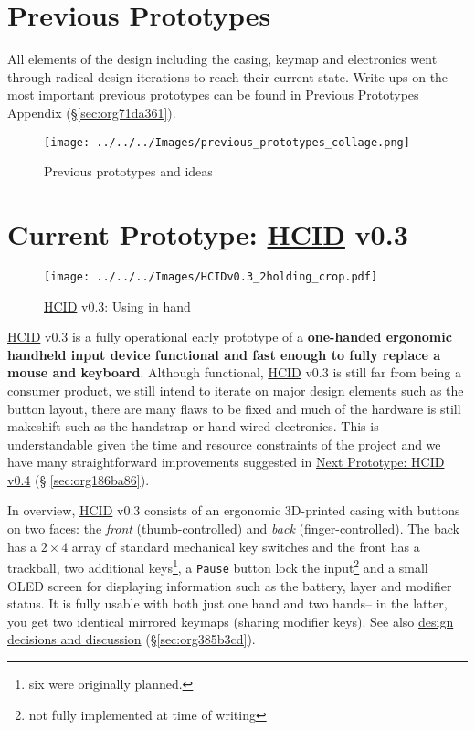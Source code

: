 \documentclass[logo,bsc,singlespacing,parskip]{infthesis}
\begin{document}
\chapter{Previous Prototypes}
\label{sec:orgfd8385b}
All elements of the design including the casing, keymap and electronics went through radical design iterations to reach their current state.
Write-ups on the most important previous prototypes can be found in \hyperref[sec:org71da361]{Previous Prototypes}  Appendix (\S \ref{sec:org71da361}).

\begin{figure}[h]
\centering
\texttt{[image: ../../../Images/previous\_prototypes\_collage.png]}
\caption{Previous prototypes and ideas}
\end{figure}

\chapter{Current Prototype: \hyperref[orgf95a76e]{HCID} v0.3}
\label{sec:org0f71899}
\begin{figure}[h]
\centering
\texttt{[image: ../../../Images/HCIDv0.3\_2holding\_crop.pdf]}
\caption{\hyperref[orgf95a76e]{HCID} v0.3: Using in hand}
\end{figure}

\hyperref[orgf95a76e]{HCID} v0.3 is a fully operational early prototype of a \textbf{one-handed ergonomic handheld input device functional and fast enough to fully replace a mouse and keyboard}.
Although functional, \hyperref[orgf95a76e]{HCID} v0.3 is still far from being a consumer product, we still intend to iterate on major design elements such as the button layout, there are many flaws to be fixed and much of the hardware is still makeshift such as the handstrap or hand-wired electronics.
This is understandable given the time and resource constraints of the project and we have many straightforward improvements suggested in \hyperref[sec:org186ba86]{Next Prototype: HCID v0.4}  (§ \ref{sec:org186ba86}).

In overview, \hyperref[orgf95a76e]{HCID} v0.3 consists of an ergonomic 3D-printed casing with buttons on two faces: the \emph{front} (thumb-controlled) and \emph{back} (finger-controlled).
The back has a \(2\times4\) array of standard mechanical key switches and the front has a trackball, two additional keys\footnote{six were originally planned.}, a \texttt{Pause} button lock the input\footnote{not fully implemented at time of writing} and a small OLED screen for displaying information such as the battery, layer and modifier status.
It is fully usable with both just one hand and two hands-- in the latter, you get two identical mirrored keymaps (sharing modifier keys).
See also \hyperref[sec:org385b3cd]{design decisions and discussion} (\S \ref{sec:org385b3cd}).
\end{document}
